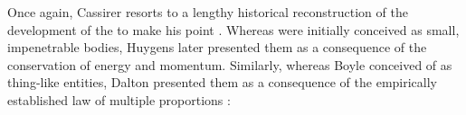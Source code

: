 \documentclass[submitted,12pt]{article}
\providecommand{\DIFdelbegin}{} %
\begin{document}
Once again, Cassirer resorts to a lengthy historical reconstruction of the development of the  to make his point \citep[chap.~IV.2]{Cassirer1936}. Whereas  were initially conceived as small, impenetrable bodies, Huygens later presented them as a consequence of the conservation of energy and momentum. Similarly, whereas Boyle conceived of  as thing-like entities, Dalton presented them as a consequence of the empirically established law of multiple proportions :

\DIFdelbegin %
\end{document}
